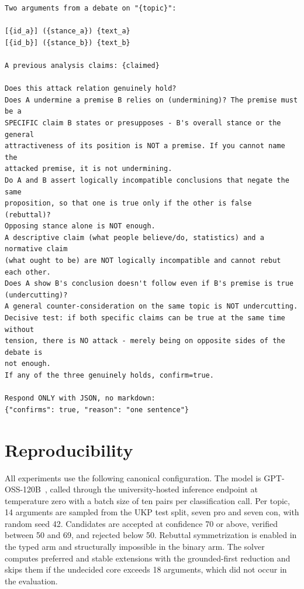 \begin{lstlisting}[breaklines=true, basicstyle=\ttfamily\footnotesize]
Two arguments from a debate on "{topic}":

[{id_a}] ({stance_a}) {text_a}
[{id_b}] ({stance_b}) {text_b}

A previous analysis claims: {claimed}

Does this attack relation genuinely hold?
Does A undermine a premise B relies on (undermining)? The premise must be a
SPECIFIC claim B states or presupposes - B's overall stance or the general
attractiveness of its position is NOT a premise. If you cannot name the
attacked premise, it is not undermining.
Do A and B assert logically incompatible conclusions that negate the same
proposition, so that one is true only if the other is false (rebuttal)?
Opposing stance alone is NOT enough.
A descriptive claim (what people believe/do, statistics) and a normative claim
(what ought to be) are NOT logically incompatible and cannot rebut each other.
Does A show B's conclusion doesn't follow even if B's premise is true
(undercutting)?
A general counter-consideration on the same topic is NOT undercutting.
Decisive test: if both specific claims can be true at the same time without
tension, there is NO attack - merely being on opposite sides of the debate is
not enough.
If any of the three genuinely holds, confirm=true.

Respond ONLY with JSON, no markdown:
{"confirms": true, "reason": "one sentence"}
\end{lstlisting}

\section{Reproducibility}
\label{sec:appendix:repro}

All experiments use the following canonical configuration. The model is
GPT-OSS-120B~\cite{gptoss2025}, called through the university-hosted inference
endpoint at temperature zero with a batch size of ten pairs per classification
call. Per
topic, 14 arguments are sampled from the UKP test split, seven pro and seven
con, with random seed 42. Candidates are accepted at confidence 70 or above,
verified between 50 and 69, and rejected below 50. Rebuttal symmetrization is
enabled in the typed arm and structurally impossible in the binary arm. The
solver computes preferred and stable extensions with the grounded-first
reduction and skips them if the undecided core exceeds 18 arguments, which did
not occur in the evaluation.

